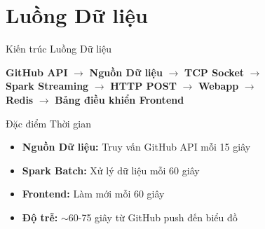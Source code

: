 \documentclass[aspectratio=169]{beamer}
\begin{document}
\section{Luồng Dữ liệu}

\begin{frame}{Kiến trúc Luồng Dữ liệu}
    \begin{center}
        \Large
        \textbf{GitHub API} $\rightarrow$ \textbf{Nguồn Dữ liệu} $\rightarrow$ \textbf{TCP Socket} $\rightarrow$ \\
        \vspace{0.3cm}
        \textbf{Spark Streaming} $\rightarrow$ \textbf{HTTP POST} $\rightarrow$ \textbf{Webapp} $\rightarrow$ \\
        \vspace{0.3cm}
        \textbf{Redis} $\rightarrow$ \textbf{Bảng điều khiển Frontend}
    \end{center}
    
    \vspace{0.5cm}
    \begin{block}{Đặc điểm Thời gian}
        \begin{itemize}
            \item \textbf{Nguồn Dữ liệu:} Truy vấn GitHub API mỗi 15 giây
            \item \textbf{Spark Batch:} Xử lý dữ liệu mỗi 60 giây
            \item \textbf{Frontend:} Làm mới mỗi 60 giây
            \item \textbf{Độ trễ:} $\sim$60-75 giây từ GitHub push đến biểu đồ
        \end{itemize}
    \end{block}
\end{frame}
\end{document}
